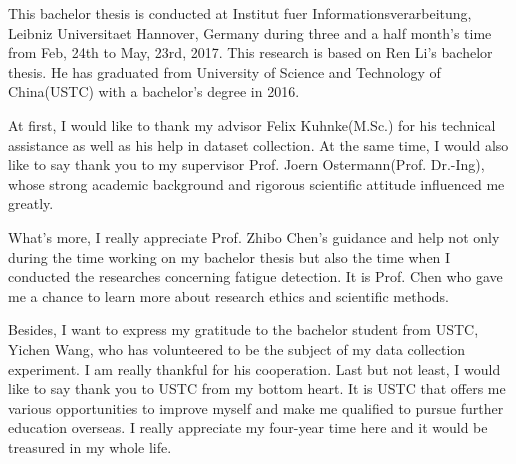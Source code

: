 \begin{acknowledgements}
This bachelor thesis is conducted at Institut fuer Informationsverarbeitung, Leibniz Universitaet Hannover, Germany during three and a half month's time from Feb, 24th to May, 23rd, 2017. This research is based on Ren Li's bachelor thesis. He has graduated from University of Science and Technology of China(USTC) with a bachelor's degree in 2016. 

At first, I would like to thank my advisor Felix Kuhnke(M.Sc.) for his technical assistance as well as his help in dataset collection. At the same time, I would also like to say thank you to my supervisor Prof. Joern Ostermann(Prof. Dr.-Ing), whose strong academic background and rigorous scientific attitude influenced me greatly. 

What's more, I really appreciate Prof. Zhibo Chen's guidance and help not only during the time working on my bachelor thesis but also the time when I conducted the researches concerning fatigue detection. It is Prof. Chen who gave me a chance to learn more about research ethics and scientific methods.

Besides, I want to express my gratitude to the bachelor student from USTC, Yichen Wang, who has volunteered to be the subject of my data collection experiment. I am really thankful for his cooperation.
Last but not least, I would like to say thank you to USTC from my bottom heart. It is USTC that offers me various opportunities to improve myself and make me qualified to pursue further education overseas. I really appreciate my four-year time here and it would be treasured in my whole life.











\end{acknowledgements}
